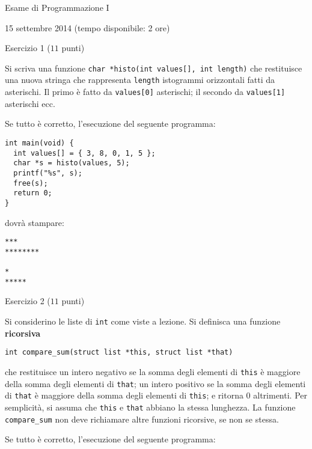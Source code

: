 \documentclass[12pt]{article}
\begin{document}
\begin{center}{\LARGE Esame di Programmazione I}\\
\vspace*{-2ex}
\begin{center}
  \large 15 settembre 2014 (tempo disponibile: 2 ore)
\end{center}
\end{center}
\begin{center}{\Large Esercizio 1} ($11$ punti)
\end{center}
Si scriva una funzione \texttt{char *histo(int values[], int length)}
che restituisce una nuova stringa che rappresenta \texttt{length} istogrammi orizzontali fatti
da asterischi. Il primo \`e
fatto da \texttt{values[0]} asterischi; il secondo da \texttt{values[1]} asterischi ecc.

Se tutto \`e corretto, l'esecuzione del seguente programma:

{\small
\begin{verbatim}
int main(void) {
  int values[] = { 3, 8, 0, 1, 5 };
  char *s = histo(values, 5);
  printf("%s", s);
  free(s);
  return 0;
}
\end{verbatim}}

\noindent
dovr\`a stampare:
%
{\small
\begin{verbatim}
***
********

*
*****
\end{verbatim}}

\vspace*{1ex}
\begin{center}{\Large Esercizio 2} ($11$ punti)\end{center}
%
Si considerino le liste di \texttt{int} come viste a lezione. Si definisca una funzione
\textbf{ricorsiva}
%
\begin{verbatim}
int compare_sum(struct list *this, struct list *that)
\end{verbatim}
%
che restituisce un intero negativo se la somma degli elementi di \texttt{this} \`e maggiore
della somma degli elementi di \texttt{that}; un intero positivo se la somma degli elementi di
\texttt{that} \`e maggiore
della somma degli elementi di \texttt{this}; e ritorna 0 altrimenti. Per semplicit\`a, si assuma
che \texttt{this} e \texttt{that} abbiano la stessa lunghezza. La funzione {\tt compare\_sum} non deve richiamare altre funzioni ricorsive, se non se stessa.

Se tutto \`e corretto, l'esecuzione del seguente programma:
\end{document}
